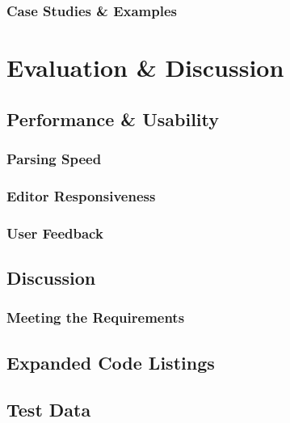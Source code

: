 \documentclass[11pt]{report}
\begin{document}
\section{Case Studies \& Examples}

\part{Evaluation \& Discussion}

\chapter{Performance \& Usability}
\section{Parsing Speed}
\section{Editor Responsiveness}
\section{User Feedback}

\chapter{Discussion}
\section{Meeting the Requirements}

\printbibliography

\appendix


\chapter{Expanded Code Listings}

\chapter{Test Data}
\end{document}
